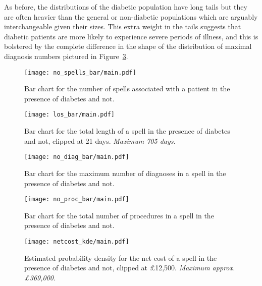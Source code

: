 As before, the distributions of the diabetic population have long tails but they
are often heavier than the general or non-diabetic populations which are
arguably interchangeable given their sizes. This extra weight in the tails
suggests that diabetic patients are more likely to experience severe periods of
illness, and this is bolstered by the complete difference in the shape of the
distribution of maximal diagnosis numbers pictured in
Figure~\ref{fig:diab_no_diag_bar}.

\begin{figure}[htbp]
    \centering
    \texttt{[image: no\_spells\_bar/main.pdf]}
    \caption{Bar chart for the number of spells associated with a patient in the
        presence of diabetes and not.}%
    \label{fig:diab_no_spells_bar}
\end{figure}

\begin{figure}[htbp]
    \centering
    \texttt{[image: los\_bar/main.pdf]}
    \caption{Bar chart for the total length of a spell in the presence of
        diabetes and not, clipped at 21 days. \textit{Maximum 705 days.}}%
    \label{fig:diab_los_bar}
\end{figure}

\begin{figure}[htbp]
    \centering
    \texttt{[image: no\_diag\_bar/main.pdf]}
    \caption{Bar chart for the maximum number of diagnoses in a spell in the
        presence of diabetes and not.}%
    \label{fig:diab_no_diag_bar}
\end{figure}

\begin{figure}[htbp]
    \centering
    \texttt{[image: no\_proc\_bar/main.pdf]}
    \caption{Bar chart for the total number of procedures in a spell in the
        presence of diabetes and not.}%
    \label{fig:diab_no_proc_bar}
\end{figure}

\begin{figure}[htbp]
    \centering
    \texttt{[image: netcost\_kde/main.pdf]}
    \caption{Estimated probability density for the net cost of a spell in the
        presence of diabetes and not, clipped at \pounds12,500. \textit{Maximum
        approx. \pounds369,000.}}%
    \label{fig:diab_netcost_kde}
\end{figure}

